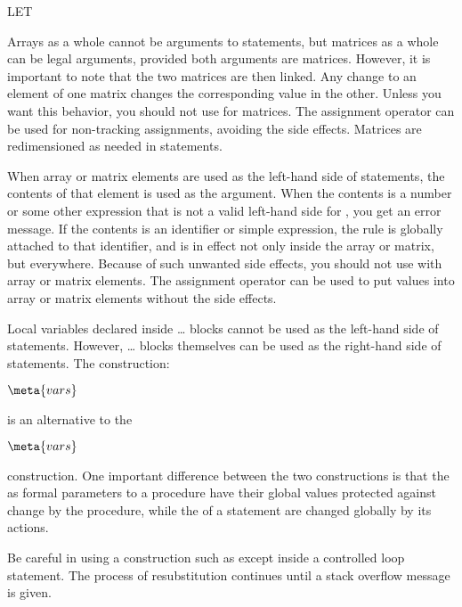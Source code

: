 \begin{Command}{LET}
\begin{Comments}
Arrays as a whole cannot be arguments to  statements, but
matrices as a whole can be legal arguments, provided both arguments are
matrices.  However, it is important to note that the two matrices are then
linked.  Any change to an element of one matrix changes the corresponding
value in the other.  Unless you want this behavior, you should not use
 for matrices.  The assignment operator  can be used
for non-tracking assignments, avoiding the side effects.  Matrices are
redimensioned as needed in  statements.

When array or matrix elements are used as the left-hand side of 
statements, the contents of that element is used as the argument.  When the 
contents is a number or some other expression that is not a valid left-hand 
side for , you get an error message.  If the contents is an
identifier or simple expression, the  rule is globally attached 
to that identifier, and is in effect not only inside the array or matrix, 
but everywhere.  Because of such unwanted side effects, you should not 
use  with array or matrix elements.  The assignment operator 
\name{:=} can be used to put values into array or matrix elements without 
the side effects.

Local variables declared inside \ldots{} blocks cannot
be used as the left-hand side of  statements.  However,
\ldots{} blocks themselves can be used as the
right-hand side of  statements.  The construction:
\begin{Syntax}
         
        \(\meta{vars}\)\name{=}
\end{Syntax}
is an alternative to the 
\begin{Syntax}
         \(\meta{vars}\)\name{;}
\end{Syntax}
construction.  One important difference between the two constructions is that
the  as formal parameters to a procedure have their global values
protected against change by the procedure, while the  of a 
 statement are changed globally by its actions. 

Be careful in using a construction such as  except inside
a controlled loop statement.  The process of resubstitution continues until 
a stack overflow message is given.  


\end{Comments}
\end{Command}
